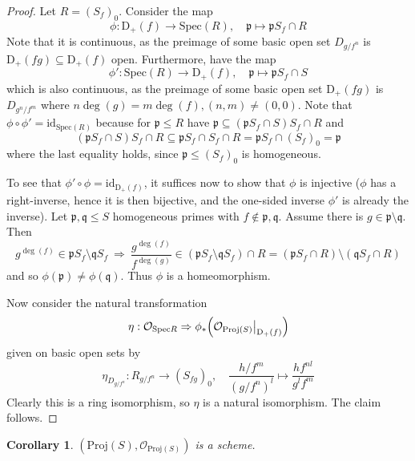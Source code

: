 \documentclass{scrartcl}
\newcommand{\D}[1]{\mathrm{D}_+(#1)}
\newcommand{\p}{\mathfrak{p}}
\newcommand{\q}{\mathfrak{q}}
\newcommand{\Spec}{\mathrm{Spec}}
\newcommand{\Proj}{\mathrm{Proj}}
\renewcommand{\O}{\mathcal{O}}
\newcommand\restr[2]{{
    \left.\kern-\nulldelimiterspace
    #1
    \vphantom{\big|}
    \right|_{#2}
}}
\newtheorem{corollary}[subsection]{Corollary}
\theoremstyle{definition}
\begin{document}
\begin{proof}
    Let $R = (S_f)_0$.
    Consider the map
    \begin{equation*}
        \phi: \D{f} \to \Spec(R), \quad \p \mapsto \p S_f \cap R
    \end{equation*}
    Note that it is continuous, as the preimage of some basic open set $D_{g/f^n}$ is $\D{fg} \subseteq \D{f}$ open.
    Furthermore, have the map
    \begin{equation*}
        \phi': \Spec(R) \to \D{f}, \quad \p \mapsto \p S_f \cap S
    \end{equation*}
    which is also continuous, as the preimage of some basic open set $\D{fg}$ is $D_{g^n/f^m}$ where $n\deg(g) = m\deg(f), (n, m) \neq (0, 0)$.
    Note that $\phi \circ \phi' = \mathrm{id}_{\Spec(R)}$ because for $\p \leq R$ have $\p \subseteq (\p S_f \cap S) S_f \cap R$ and
    \begin{equation*}
        (\p S_f \cap S) S_f \cap R \subseteq \p S_f \cap S_f \cap R = \p S_f \cap (S_f)_0 = \p
    \end{equation*}
    where the last equality holds, since $\p \leq (S_f)_0$ is homogeneous.
    
    To see that $\phi' \circ \phi = \mathrm{id}_{\D{f}}$, it suffices now to show that $\phi$ is injective ($\phi$ has a right-inverse, hence it is then bijective, and the one-sided inverse $\phi'$ is already the inverse).
    Let $\p, \q \leq S$ homogeneous primes with $f \notin \p, \q$.
    Assume there is $g \in \p \setminus \q$.
    Then
    \begin{equation*}
        g^{\deg(f)} \in \p S_f \setminus \q S_f  \ \Rightarrow \ \frac {g^{\deg(f)}} {f^{\deg(g)}} \in (\p S_f \setminus \q S_f) \cap R = (\p S_f \cap R) \setminus (\q S_f \cap R)
    \end{equation*}
    and so $\phi(\p) \neq \phi(\q)$. Thus $\phi$ is a homeomorphism.

    Now consider the natural transformation
    \begin{equation*}
        \eta: \O_{\Spec R} \Rightarrow \phi_*\Bigl( \restr{\O_{\Proj(S)}}{\D{f}} \Bigr)
    \end{equation*}
    given on basic open sets by
    \begin{equation*}
        \eta_{D_{g/f^n}}: R_{g/f^n} \to (S_{f g})_0, \quad \frac {h/f^m} {(g/f^n)^l} \mapsto \frac {h f^{nl}} {g^l f^m}
    \end{equation*}
    Clearly this is a ring isomorphism, so $\eta$ is a natural isomorphism.
    The claim follows.
\end{proof}
\begin{corollary}
    $(\Proj(S), \O_{\Proj(S)})$ is a scheme.
\end{corollary}
\end{document}
